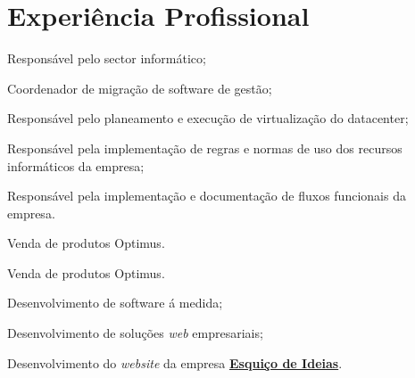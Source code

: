 \documentclass[letterpaper]{deedy-resume} %
\begin{document}
\begin{minipage}[t]{0.66\textwidth}

\section{Experiência Profissional}


\vspace{\topsep}
\begin{tightitemize}
	\item Responsável pelo sector informático;
	\item Coordenador de migração de software de gestão;
	\item Responsável pelo planeamento e  execução de virtualização do datacenter;
	\item Responsável pela implementação de regras e normas de uso dos recursos informáticos da empresa;
	\item Responsável pela implementação e documentação de fluxos funcionais da empresa.
\end{tightitemize}

\sectionspace


\begin{tightitemize}
	\item Venda de produtos Optimus.
\end{tightitemize}

\sectionspace


\begin{tightitemize}
	\item Venda de produtos Optimus.
\end{tightitemize}

\sectionspace


\begin{tightitemize}
	\item Desenvolvimento de software á medida;
	\item Desenvolvimento de soluções \textit{web} empresariais;
	\item Desenvolvimento do \textit{website} da empresa \href{http://esquicodeideias.com}{\textbf{Esquiço de Ideias}}.
\end{tightitemize}


\end{minipage}
\end{document}
